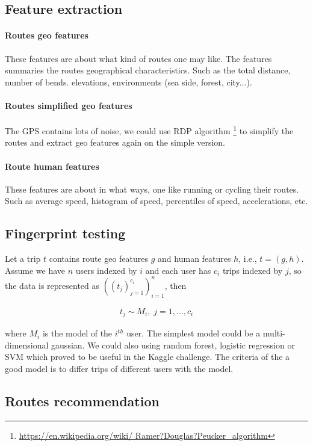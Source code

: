 \documentclass[a4paper,11pt]{article}
\begin{document}
\subsection{Feature extraction}

\paragraph{Routes geo features}
These features are about what kind of routes one may like. 
The features summaries the routes geographical characteristics.
Such as the total distance, number of bends. elevations, environments (sea side, forest, city...). 

\paragraph{Routes simplified geo features}
The GPS contains lots of noise, we could use RDP algorithm \footnote{\url{https://en.wikipedia.org/wiki/
Ramer?Douglas?Peucker_algorithm}} to simplify the routes and extract geo features again on the
simple version.

\paragraph{Route human features} These features are about in what ways, one like running or cycling
their routes. Such as average speed, histogram of speed, percentiles of speed, accelerations, etc.

\subsection{Fingerprint testing}
Let a trip $t$ contains route geo features $g$ and human features $h$, i.e., $t = (g,h)$. Assume
we have $n$ users indexed by $i$ and each user has $c_i$ trips indexed by $j$,  so the data is
represented as $((t_j)_{j=1}^{c_i})_{i=1}^n$, then

\begin{align*}
t_j \sim M_i, \; j = 1, \ldots, c_i 
\end{align*}

where $M_i$ is the model of the $i^{th}$ user. The simplest model could be a multi-dimensional
gaussian.  We could also using random forest, logistic regression or SVM which proved to be 
useful in the Kaggle challenge. The criteria of the a good model is to differ trips of different users 
with the model.

\subsection{Routes recommendation}
\end{document}
